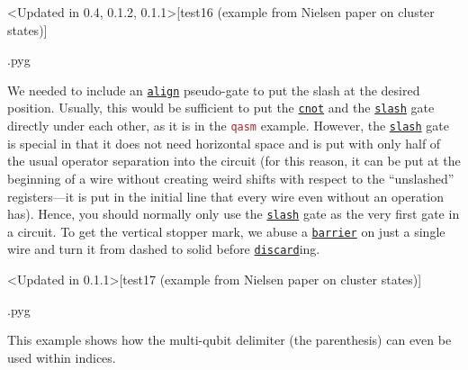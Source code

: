 \documentclass{scrartcl}
\makeatletter
\newenvironment{codeexample}{%
   \VerbatimEnvironment%
   \let\FVB@VerbatimOut\minted@FVB@VerbatimOut
   \let\FVE@VerbatimOut\minted@FVE@VerbatimOut
   \minted@configlang{tex}%
   \minted@fvset
   \begin{VerbatimOut}[codes={\catcode`\^^I=12},firstline,lastline]{\minted@jobname.pyg}%
}{
   \end{VerbatimOut}%
   \minted@langlinenoson%
   \savebox\codeexamplebox{ \minted@jobname.pyg}%
   \ifdim\wd\codeexamplebox>\dimexpr.5\linewidth-3mm\relax%
      \wd\codeexamplebox=.5\linewidth%
   \else%
      \wd\codeexamplebox=\dimexpr\wd\codeexamplebox+3mm\relax%
   \fi%
   \noindent\begin{minipage}{\wd\codeexamplebox}%
      \centering%
      \usebox\codeexamplebox%
   \end{minipage}%
   \begin{minipage}{\dimexpr\linewidth-\wd\codeexamplebox\relax}%
      \minted@pygmentize{\minted@lang}%
   \end{minipage}%
   \minted@langlinenosoff%
   \par%
}
\def\pkg#1{\textcolor{brown}{\texttt{#1}}}
\def\gate#1{\hyperref[gate:#1]{\texttt{#1}}}
\makeatother
\begin{document}
         \begin{example}<Updated in 0.4, 0.1.2, 0.1.1>[test16 (example from Nielsen paper on cluster states)]
            \begin{codeexample}
            \end{codeexample}
            We needed to include an \gate{align} pseudo\hyp gate to put the slash at the desired position.
            Usually, this would be sufficient to put the \gate{cnot} and the \gate{slash} gate directly under each other, as it is in the \pkg{qasm} example.
            However, the \gate{slash} gate is special in that it does not need horizontal space and is put with only half of the usual operator separation into the circuit (for this reason, it can be put at the beginning of a wire without creating weird shifts with respect to the ``unslashed'' registers---it is put in the initial line that every wire even without an operation has).
            Hence, you should normally only use the \gate{slash} gate as the very first gate in a circuit.
            To get the vertical stopper mark, we abuse a \gate{barrier} on just a single wire and turn it from dashed to solid before \gate{discard}ing.
         \end{example}

         \begin{example}<Updated in 0.1.1>[test17 (example from Nielsen paper on cluster states)]
            \begin{codeexample}
            \end{codeexample}
            This example shows how the multi\hyp qubit delimiter (the parenthesis) can even be used within indices.
         \end{example}
\end{document}
